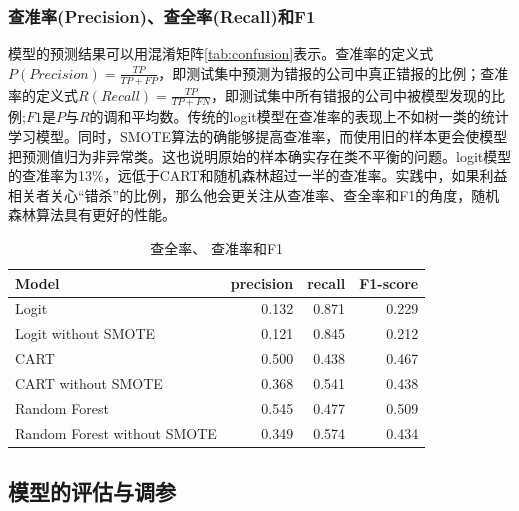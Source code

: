 \documentclass{article}
\begin{document}
\subsubsection{查准率(Precision)、查全率(Recall)和F1}
模型的预测结果可以用混淆矩阵\ref{tab:confusion}表示。查准率的定义式$P(Precision) = \frac{TP}{TP+FP}$，即测试集中预测为错报的公司中真正错报的比例；查准率的定义式$R(Recall) = \frac{TP}{TP+FN}$，即测试集中所有错报的公司中被模型发现的比例;$F1$是$P$与$R$的调和平均数。传统的logit模型在查准率的表现上不如树一类的统计学习模型。同时，SMOTE算法的确能够提高查准率，而使用旧的样本更会使模型把预测值归为非异常类。这也说明原始的样本确实存在类不平衡的问题。logit模型的查准率为13\%，远低于CART和随机森林超过一半的查准率。实践中，如果利益相关者关心“错杀”的比例，那么他会更关注从查准率、查全率和F1的角度，随机森林算法具有更好的性能。

\begin{table}[H] \centering
\caption{查全率、 查准率和F1}
    \begin{tabular}{lrrr} \hline\hline
    Model & \multicolumn{1}{l}{precision} & \multicolumn{1}{l}{recall} & \multicolumn{1}{l}{F1-score} \\ \hline
    Logit & 0.132 & 0.871 & 0.229 \\
    Logit without SMOTE & 0.121 & 0.845 & 0.212 \\
    CART  & 0.500 & 0.438 & 0.467 \\
    CART without SMOTE & 0.368 & 0.541 & 0.438 \\
    Random Forest & 0.545 & 0.477 & 0.509 \\
    Random Forest without SMOTE & 0.349 & 0.574 & 0.434 \\ \hline\hline
    \end{tabular}%
  \label{tab:PrecisionRecal}%
\end{table}%

\subsection{模型的评估与调参}
\end{document}
